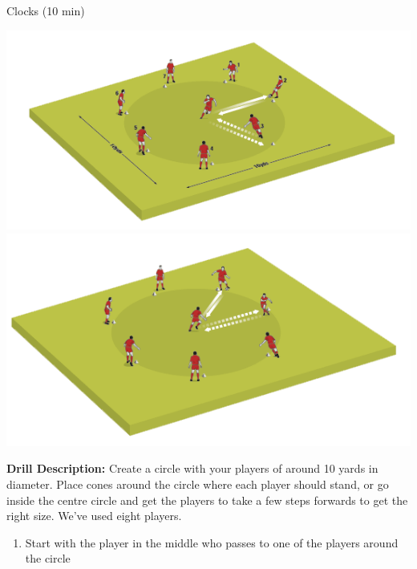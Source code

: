 \begin{evenBlock}{Clocks (10 min)}

\begin{minipage}[t]{\linewidth}
    \centering
    
    \begin{minipage}{.3\linewidth} %
        \centering
        \includegraphics[width=\textwidth]{../img/Trimmed/Clocks1}
        \vspace{12pt}
        \includegraphics[width=\textwidth]{../img/Trimmed/Clocks2}
    \end{minipage}
    \hspace{0.05\linewidth}
    \begin{minipage}{.6\linewidth} %
        \textbf{Drill Description:}
        Create a circle with your players of around 10 yards in diameter. Place cones around the circle where each player should stand, or go inside the centre circle and get the players to take a few steps forwards to get the right size. We’ve used eight players.
        \begin{enumerate}
        \setlength{\itemsep}{0pt}
        \setlength{\parskip}{0pt}
        \setlength{\parsep}{0pt}
        \item Start with the player in the middle who passes to one of the players around the circle

\end{enumerate}
\end{minipage}
\end{minipage}
\end{evenBlock}
